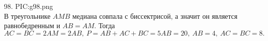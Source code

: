 98. {{PIC:g98.png}}\\
В треугольнике $AMB$ медиана совпала с биссектрисой, а значит он является равнобедренным и $AB=AM.$ Тогда $AC=BC=2AM=2AB,\ P=AB+AC+BC=5AB=20,\ AB=4,\ AC=BC=8.$\\
